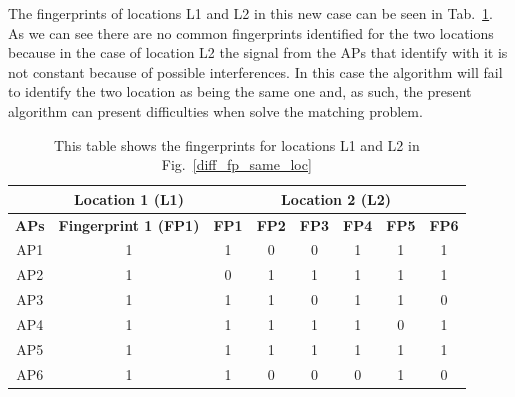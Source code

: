 The fingerprints of locations L1 and L2 in this new case can be seen in
Tab.~\ref{tab:table_fingerprints_same_loc}. As we can see there are no common
fingerprints identified for the two locations because in the case of location L2
the signal from the APs that identify with it is not constant because of
possible interferences. In this case the algorithm will fail to identify the two
location as being the same one and, as such, the present algorithm can present
difficulties when solve the matching problem.

\begin{table}[h]
\begin{tabular}{|c|c|c|c|c|c|c|c|}
\hline
             & \textbf{Location 1 (L1)}     & \multicolumn{6}{c|}{\textbf{Location 2 (L2)}}                                           \\ \hline
\textbf{APs} & \textbf{Fingerprint 1 (FP1)} & \textbf{FP1} & \textbf{FP2} & \textbf{FP3} & \textbf{FP4} & \textbf{FP5} & \textbf{FP6} \\ \hline
AP1          & 1                            & 1            & 0            & 0            & 1            & 1            & 1            \\
AP2          & 1                            & 0            & 1            & 1            & 1            & 1            & 1            \\
AP3          & 1                            & 1            & 1            & 0            & 1            & 1            & 0            \\
AP4          & 1                            & 1            & 1            & 1            & 1            & 0            & 1            \\
AP5          & 1                            & 1            & 1            & 1            & 1            & 1            & 1            \\
AP6          & 1                            & 1            & 0            & 0            & 0            & 1            & 0            \\ \hline
\end{tabular}
\caption{This table shows the fingerprints for locations L1 and L2 in
Fig.~\ref{diff_fp_same_loc}}
\label{tab:table_fingerprints_same_loc}
\end{table}

